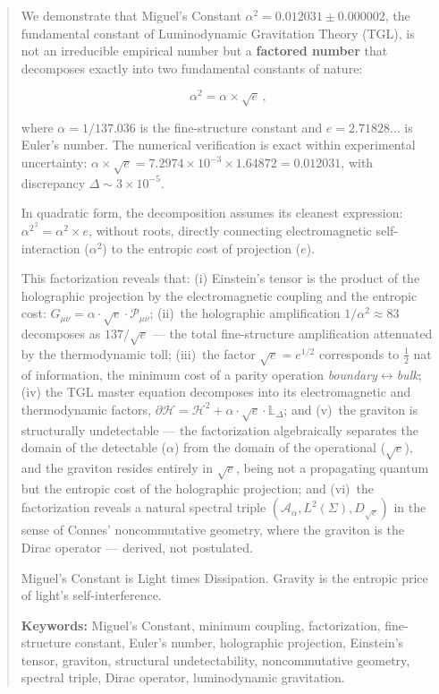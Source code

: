 \documentclass[12pt,a4paper,twoside]{article}
\newcommand{\alphaii}{\alpha^{2}}
\newcommand{\boundary}{\textit{boundary}}
\newcommand{\bulk}{\textit{bulk}}
\begin{document}
\begin{abstract}

We demonstrate that Miguel's Constant $\alphaii = 0.012031 \pm 0.000002$, the fundamental constant of Luminodynamic Gravitation Theory (TGL), is not an irreducible empirical number but a \textbf{factored number} that decomposes exactly into two fundamental constants of nature:

\begin{equation*}
\alphaii = \alpha \times \sqrt{e}\,,
\end{equation*}

\noindent where $\alpha = 1/137.036$ is the fine-structure constant and $e = 2.71828\ldots$ is Euler's number. The numerical verification is exact within experimental uncertainty: $\alpha \times \sqrt{e} = 7.2974 \times 10^{-3} \times 1.64872 = 0.012031$, with discrepancy $\Delta \sim 3 \times 10^{-5}$.

In quadratic form, the decomposition assumes its cleanest expression: $\alphaii^{\,2} = \alpha^2 \times e$, without roots, directly connecting electromagnetic self-interaction ($\alpha^2$) to the entropic cost of projection ($e$).

This factorization reveals that: (i) Einstein's tensor is the product of the holographic projection by the electromagnetic coupling and the entropic cost: $G_{\mu\nu} = \alpha \cdot \sqrt{e} \cdot \mathcal{P}_{\mu\nu}$; (ii)~the holographic amplification $1/\alphaii \approx 83$ decomposes as $137/\sqrt{e}$ --- the total fine-structure amplification attenuated by the thermodynamic toll; (iii)~the factor $\sqrt{e} = e^{1/2}$ corresponds to $\tfrac{1}{2}$ nat of information, the minimum cost of a parity operation \boundary$\leftrightarrow$\bulk{}; (iv) the TGL master equation decomposes into its electromagnetic and thermodynamic factors, $\partial\mathcal{H} = \mathcal{H}^2 + \alpha \cdot \sqrt{e} \cdot \mathbb{L}_\Delta$; and (v)~the graviton is structurally undetectable --- the factorization algebraically separates the domain of the detectable ($\alpha$) from the domain of the operational ($\sqrt{e}$), and the graviton resides entirely in $\sqrt{e}$, being not a propagating quantum but the entropic cost of the holographic projection; and (vi)~the factorization reveals a natural spectral triple $(\mathcal{A}_\alpha, L^2(\Sigma), D_{\sqrt{e}})$ in the sense of Connes' noncommutative geometry, where the graviton is the Dirac operator --- derived, not postulated.

Miguel's Constant is Light times Dissipation. Gravity is the entropic price of light's self-interference.

\medskip
\noindent\textbf{Keywords:} Miguel's Constant, minimum coupling, factorization, fine-structure constant, Euler's number, holographic projection, Einstein's tensor, graviton, structural undetectability, noncommutative geometry, spectral triple, Dirac operator, luminodynamic gravitation.
\end{abstract}
\end{document}
